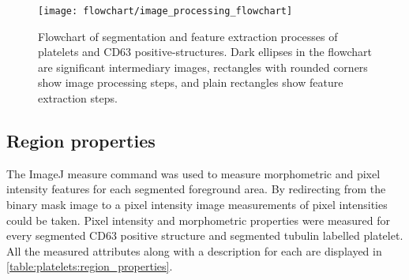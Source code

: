 \begin{figure}[htbp]
	\centering
	\texttt{[image: flowchart/image\_processing\_flowchart]}
	\caption[Flowchart of segmentation processes of endothelial platelets]{Flowchart of segmentation and feature extraction processes of platelets and CD63 positive-structures. Dark ellipses in the flowchart are significant intermediary images, rectangles with rounded corners show image processing steps, and plain rectangles show feature extraction steps.}
	\label{figure:platelets:image_processing:flowchart}
\end{figure}

\subsection{Region properties}
\label{platelets:morphometric_measurements}
The ImageJ measure command was used to measure morphometric and pixel intensity features for each segmented foreground area. By redirecting from the binary mask image to a pixel intensity image measurements of pixel intensities could be taken. Pixel intensity and morphometric properties were measured for every segmented CD63 positive structure and segmented tubulin labelled platelet. All the measured attributes along with a description for each are displayed in \autoref{table:platelets:region_properties}.

